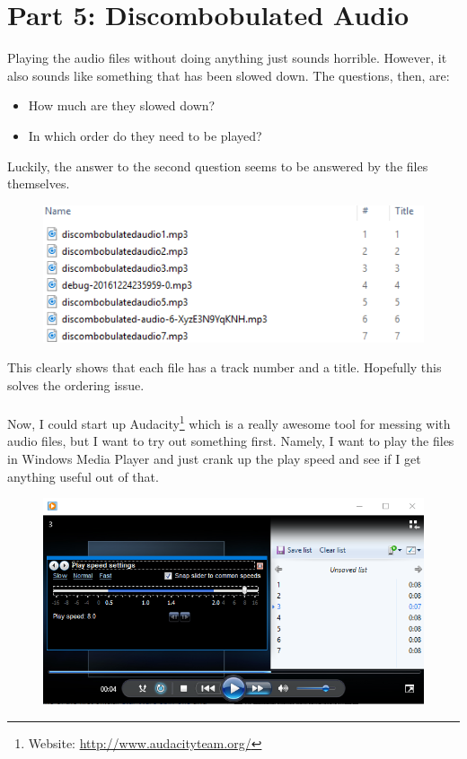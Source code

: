 \documentclass[writeup.tex]{subfiles}
\begin{document}
			
	
\section{Part 5: Discombobulated Audio} \label{section.part5}
	Playing the audio files without doing anything just sounds horrible. However, it also sounds like something that has been slowed down. The questions, then, are:
	\begin{itemize}
		\item How much are they slowed down?
		\item In which order do they need to be played?
	\end{itemize}
	
	Luckily, the answer to the second question seems to be answered by the files themselves.
	
		\begin{figure}[H]
			\centering
			\includegraphics[scale=1]{"screenshots/audio_files"}
		\end{figure}
		
		This clearly shows that each file has a track number and a title. Hopefully this solves the ordering issue.\\
		\\
		Now, I could start up Audacity\footnote{Website: \url{http://www.audacityteam.org/}} which is a really awesome tool for messing with audio files, but I want to try out something first. Namely, I want to play the files in Windows Media Player and just crank up the play speed and see if I get anything useful out of that.\\

		\begin{figure}[H]
			\centering
			\includegraphics[width=\linewidth]{"screenshots/windows_media_player"}
		\end{figure}
		
\end{document}
